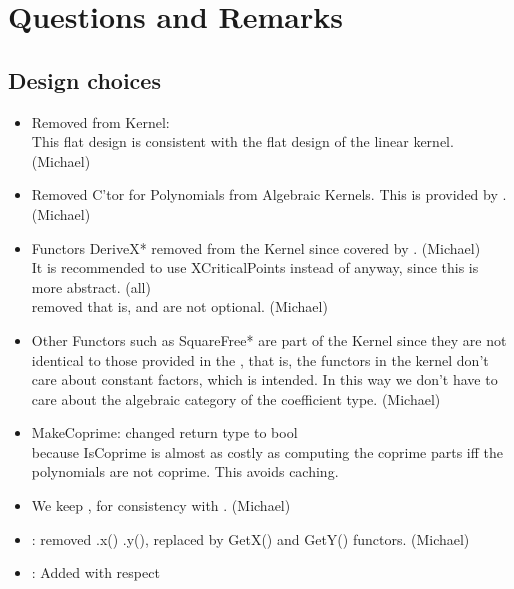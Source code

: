 
\section{Questions and Remarks}

\subsection{Design choices}

\begin{itemize}
\item 
Removed  from Kernel:\\
This flat design is consistent with the flat design of the linear kernel. 
(Michael)
\item 
Removed C'tor for Polynomials from Algebraic Kernels. 
This is provided by .
(Michael)
\item 
Functors DeriveX* removed from the Kernel since covered by 
.
(Michael)\\
It is recommended to use XCriticalPoints instead of  
anyway, since this is more abstract. (all)\\
removed  that is, 
 and  are not optional.
(Michael)
\item
Other Functors such as SquareFree* are part of the Kernel since they are not 
identical to those provided in the , that is, 
the functors in the 
kernel don't care about constant factors, which is intended. In this way we 
don't have to care about the algebraic category of the coefficient type. 
(Michael)
\item 
MakeCoprime: changed return type to bool\\
because IsCoprime is almost as costly as computing the coprime
parts iff the polynomials are not coprime. This avoids caching. 
\item
We keep , for consistency with .
(Michael)
\item 
{}: removed .x() .y(), replaced by GetX() and 
GetY() functors.
(Michael)
\item {}: Added  with respect 

\end{itemize}
